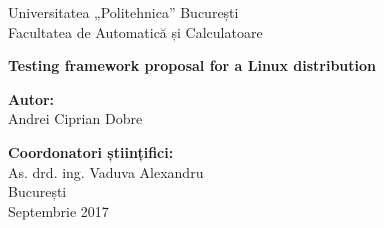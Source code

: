 \thispagestyle{empty}
\begin{center}
\large
Universitatea „Politehnica” București \\
Facultatea de Automatică și Calculatoare \\

{\LARGE
	\textbf{Testing framework proposal for a Linux distribution}
}

\vspace{3cm}
\textbf{Autor:}\\
Andrei Ciprian Dobre

\bigskip
\bigskip

\textbf{Coordonatori științifici:}\\
As. drd. ing. Vaduva Alexandru\\

București\\
Septembrie 2017 \\
\vspace*{1cm}
\end{center}
